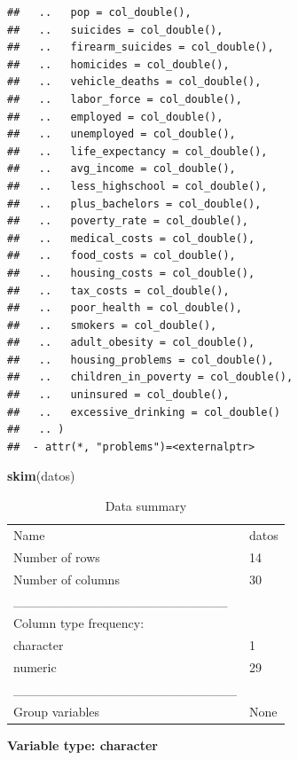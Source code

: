 \documentclass[
]{article}
\newenvironment{Shaded}{\begin{snugshade}}{\end{snugshade}}
\newcommand{\FunctionTok}[1]{\textcolor[rgb]{0.13,0.29,0.53}{\textbf{#1}}}
\newcommand{\NormalTok}[1]{#1}
\begin{document}
\begin{verbatim}
##   ..   pop = col_double(),
##   ..   suicides = col_double(),
##   ..   firearm_suicides = col_double(),
##   ..   homicides = col_double(),
##   ..   vehicle_deaths = col_double(),
##   ..   labor_force = col_double(),
##   ..   employed = col_double(),
##   ..   unemployed = col_double(),
##   ..   life_expectancy = col_double(),
##   ..   avg_income = col_double(),
##   ..   less_highschool = col_double(),
##   ..   plus_bachelors = col_double(),
##   ..   poverty_rate = col_double(),
##   ..   medical_costs = col_double(),
##   ..   food_costs = col_double(),
##   ..   housing_costs = col_double(),
##   ..   tax_costs = col_double(),
##   ..   poor_health = col_double(),
##   ..   smokers = col_double(),
##   ..   adult_obesity = col_double(),
##   ..   housing_problems = col_double(),
##   ..   children_in_poverty = col_double(),
##   ..   uninsured = col_double(),
##   ..   excessive_drinking = col_double()
##   .. )
##  - attr(*, "problems")=<externalptr>
\end{verbatim}

\begin{Shaded}
\begin{Highlighting}[]
\FunctionTok{skim}\NormalTok{(datos)}
\end{Highlighting}
\end{Shaded}

\begin{longtable}[]{@{}ll@{}}
\caption{Data summary}\tabularnewline
\toprule\noalign{}
\endfirsthead
\endhead
\bottomrule\noalign{}
\endlastfoot
Name & datos \\
Number of rows & 14 \\
Number of columns & 30 \\
\_\_\_\_\_\_\_\_\_\_\_\_\_\_\_\_\_\_\_\_\_\_\_ & \\
Column type frequency: & \\
character & 1 \\
numeric & 29 \\
\_\_\_\_\_\_\_\_\_\_\_\_\_\_\_\_\_\_\_\_\_\_\_\_ & \\
Group variables & None \\
\end{longtable}

\textbf{Variable type: character}
\end{document}
